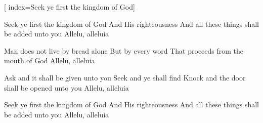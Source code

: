 



[             %
    index={Seek ye first the kingdom of God}]             %

\beginverse                       

\chordsoff  								

Seek ye first the kingdom of God
And His righteousness
And all these things shall be added unto you
Allelu, alleluia

\endverse

\beginverse                       
\chordsoff  								

Man does not live by bread alone
But by every word
That proceeds from the mouth of God
Allelu, alleluia

\endverse                         


\beginverse                       
\chordsoff  								

Ask and it shall be given unto you
Seek and ye shall find
Knock and the door shall be opened unto you
Allelu, alleluia

\endverse                         


\beginverse                       
\chordsoff  								

Seek ye first the kingdom of God
And His righteousness
And all these things shall be added unto you
Allelu, alleluia

